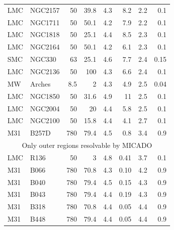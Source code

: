\documentclass{aa}
\begin{document}
\begin{appendix}
\begin{table}
\begin{tabular}{l l r r r r r r}
        LMC    & NGC2157      & 50       & 39.8 & 4.3       & 8.2     & 2.2            & 0.1           \\
        LMC    & NGC1711      & 50       & 50.1 & 4.2       & 7.9     & 2.2            & 0.1           \\
        LMC    & NGC1818      & 50       & 25.1 & 4.4       & 8.5     & 2.3            & 0.1           \\
        LMC    & NGC2164      & 50       & 50.1 & 4.2       & 6.1     & 2.3            & 0.1           \\
        SMC    & NGC330       & 63       & 25.1 & 4.6       & 7.7     & 2.4            & 0.15          \\
        LMC    & NGC2136      & 50       & 100  & 4.3       & 6.6     & 2.4            & 0.1           \\
        MW     & Arches       & 8.5      & 2    & 4.3       & 4.9     & 2.5            & 0.04          \\
        LMC    & NGC1850      & 50       & 31.6 & 4.9       & 11      & 2.5            & 0.1           \\
        LMC    & NGC2004      & 50       & 20   & 4.4       & 5.8     & 2.5            & 0.1           \\
        LMC    & NGC2100      & 50       & 15.8 & 4.4       & 4.1     & 2.7            & 0.1           \\
        M31    & B257D        & 780      & 79.4 & 4.5       & 0.8     & 3.4            & 0.9           \\
        \hline
        \multicolumn{8}{c}{Only outer regions resolvable by MICADO}                                    \\
        \hline
        LMC    & R136         & 50       & 3    & 4.8       & 0.41    & 3.7            & 0.1           \\
        M31    & B066         & 780      & 70.8 & 4.3       & 0.10    & 4.2            & 0.9           \\
        M31    & B040         & 780      & 79.4 & 4.5       & 0.15    & 4.3            & 0.9           \\
        M31    & B043         & 780      & 79.4 & 4.4       & 0.19    & 4.3            & 0.9           \\
        M31    & B318         & 780      & 70.8 & 4.4       & 0.05    & 4.4            & 0.9           \\
        M31    & B448         & 780      & 79.4 & 4.4       & 0.05    & 4.4            & 0.9           \\

\end{tabular}
\end{table}
\end{appendix}
\end{document}
